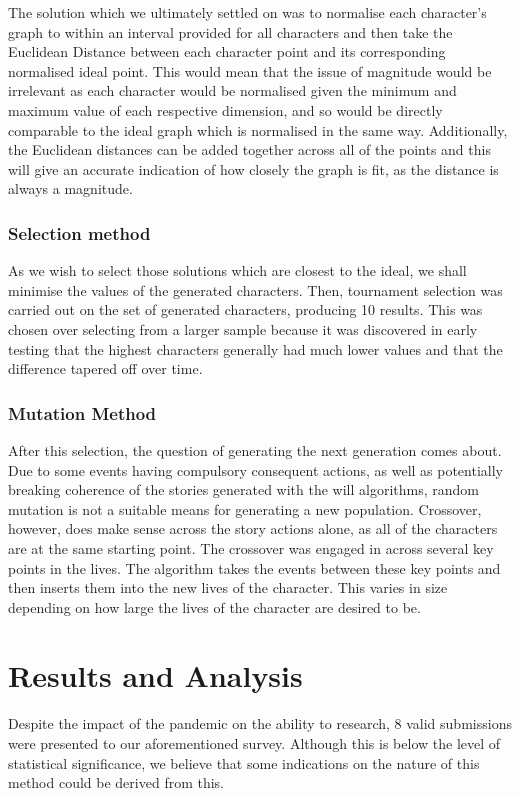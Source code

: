 \documentclass[11pt]{article}
\begin{document}
The solution which we ultimately settled on was to normalise each character's graph to within an interval provided for all characters and then take the Euclidean Distance between each character point and its corresponding normalised ideal point. This would mean that the issue of magnitude would be irrelevant as each character would be normalised given the minimum and maximum value of each respective dimension, and so would be directly comparable to the ideal graph which is normalised in the same way. Additionally, the Euclidean distances can be added together across all of the points and this will give an accurate indication of how closely the graph is fit, as the distance is always a magnitude. 

\subsubsection{Selection method}
As we wish to select those solutions which are closest to the ideal, we shall minimise the values of the generated characters. Then, tournament selection was carried out on the set of generated characters, producing 10 results. This was chosen over selecting from a larger sample because it was discovered in early testing that the highest characters generally had much lower values and that the difference tapered off over time. 

\subsubsection{Mutation Method}
After this selection, the question of generating the next generation comes about. Due to some events having compulsory consequent actions, as well as potentially breaking coherence of the stories generated with the will algorithms, random mutation is not a suitable means for generating a new population. Crossover, however, does make sense across the story actions alone, as all of the characters are at the same starting point. The crossover was engaged in across several key points in the lives. The algorithm takes the events between these key points and then inserts them into the new lives of the character. This varies in size depending on how large the lives of the character are desired to be. 


\section{Results and Analysis}
Despite the impact of the pandemic on the ability to research, 8 valid submissions were presented to our aforementioned survey. Although this is below the level of statistical significance, we believe that some indications on the nature of this method could be derived from this. 
\end{document}
